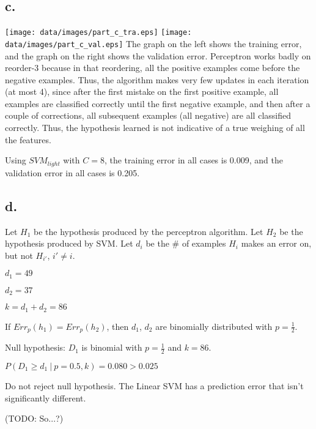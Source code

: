 \documentclass[]{article}
\begin{document}
\subsection{c.}
\texttt{[image: data/images/part\_c\_tra.eps]}
\texttt{[image: data/images/part\_c\_val.eps]}
The graph on the left shows the training error, and the graph on the right shows the validation error. Perceptron works badly on reorder-3 because in that reordering, all the positive examples come before the negative examples. Thus, the algorithm makes very few updates in each iteration (at most 4), since after the first mistake on the first positive example, all examples are classified correctly until the first negative example, and then after a couple of corrections, all subsequent examples (all negative) are all classified correctly. Thus, the hypothesis learned is not indicative of a true weighing of all the features.

Using $SVM_{light}$ with $C=8$, the training error in all cases is 0.009, and the validation error in all cases is 0.205. 

\subsection{d.}
Let $H_1$ be the hypothesis produced by the perceptron algorithm. Let $H_2$ be the hypothesis produced by SVM. Let $d_i$ be the \# of examples $H_i$ makes an error on, but not $H_{i'}$, $i' \neq i$.

$d_1 = 49$

$d_2 = 37$

$k = d_1 + d_2 = 86$

If $Err_p(h_1) = Err_p(h_2)$, then $d_1$, $d_2$ are binomially distributed with $p = \frac{1}{2}$.

Null hypothesis: $D_1$ is binomial with $p=\frac{1}{2}$ and $k=86$.

$P(D_1 \ge d_1~|~p = 0.5, k) = 0.080 > 0.025$

Do not reject null hypothesis. The Linear SVM has a prediction error that isn't significantly different.

(TODO: So...?)
\end{document}
